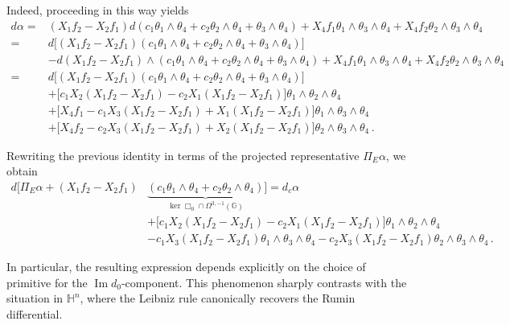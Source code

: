 \documentclass[dvipsnames]{amsart}
\theoremstyle{definition}
\theoremstyle{definition}
\numberwithin{equation}{section}
\newcommand{\G}{\mathbb{G}}
\renewcommand{\H}{\mathbb{H}}
\begin{document}
Indeed, proceeding in this way yields
\begin{align*}
    d\alpha
    ={}&
    (X_1f_2-X_2f_1)
    d(c_1\theta_1\wedge\theta_4
    +c_2\theta_2\wedge\theta_4
    +\theta_3\wedge\theta_4)+X_4f_1\theta_1\wedge\theta_3\wedge\theta_4
    +X_4f_2\theta_2\wedge\theta_3\wedge\theta_4\\
    ={}&
    d\Big[(X_1f_2-X_2f_1)
    (c_1\theta_1\wedge\theta_4
    +c_2\theta_2\wedge\theta_4
    +\theta_3\wedge\theta_4)\Big]\\
    &-d(X_1f_2-X_2f_1)
    \wedge
    (c_1\theta_1\wedge\theta_4
    +c_2\theta_2\wedge\theta_4
    +\theta_3\wedge\theta_4)+X_4f_1\theta_1\wedge\theta_3\wedge\theta_4
    +X_4f_2\theta_2\wedge\theta_3\wedge\theta_4\\
    ={}&
    d\Big[(X_1f_2-X_2f_1)
    (c_1\theta_1\wedge\theta_4
    +c_2\theta_2\wedge\theta_4
    +\theta_3\wedge\theta_4)\Big]\\
    &+\big[c_1X_2(X_1f_2-X_2f_1)
    -c_2X_1(X_1f_2-X_2f_1)\big]
    \theta_1\wedge\theta_2\wedge\theta_4\\
    &+\big[X_4f_1
    -c_1X_3(X_1f_2-X_2f_1)
    +X_1(X_1f_2-X_2f_1)\big]
    \theta_1\wedge\theta_3\wedge\theta_4\\
    &+\big[X_4f_2
    -c_2X_3(X_1f_2-X_2f_1)
    +X_2(X_1f_2-X_2f_1)\big]
    \theta_2\wedge\theta_3\wedge\theta_4\,.
\end{align*}

Rewriting the previous identity in terms of the projected representative \(\Pi_E\alpha\), we obtain
\begin{align*}
    d\Big[\Pi_E\alpha
    +(X_1f_2-X_2f_1)&
    \underbrace{(c_1\theta_1\wedge\theta_4
    +c_2\theta_2\wedge\theta_4)}_{\ker\Box_0\cap\Omega^{3,-1}(\G)}
    \Big]
    ={}
    d_c\alpha\\
    &+\big[c_1X_2(X_1f_2-X_2f_1)
    -c_2X_1(X_1f_2-X_2f_1)\big]
    \theta_1\wedge\theta_2\wedge\theta_4\\
    &-c_1X_3(X_1f_2-X_2f_1)
    \theta_1\wedge\theta_3\wedge\theta_4-c_2X_3(X_1f_2-X_2f_1)
    \theta_2\wedge\theta_3\wedge\theta_4\,.
\end{align*}

In particular, the resulting expression depends explicitly on the choice of primitive for the \(\operatorname{Im}d_0\)-component. This phenomenon sharply contrasts with the situation in \(\H^n\), where the Leibniz rule canonically recovers the Rumin differential.
\end{document}
